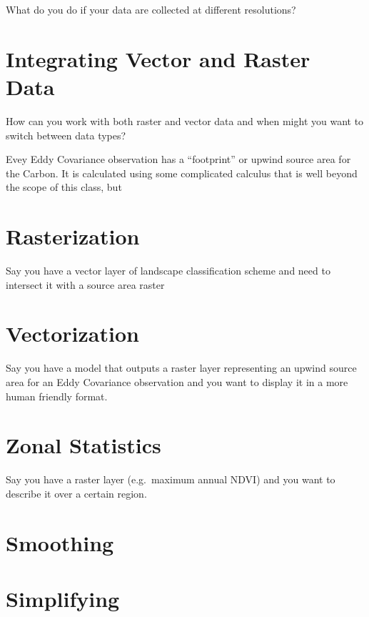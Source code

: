 \documentclass[
]{book}
\begin{document}
What do you do if your data are collected at different resolutions?

\hypertarget{integrating-vector-and-raster-data}{%
\section{Integrating Vector and Raster Data}\label{integrating-vector-and-raster-data}}

How can you work with both raster and vector data and when might you want to switch between data types?

Evey Eddy Covariance observation has a ``footprint'' or upwind source area for the Carbon. It is calculated using some complicated calculus that is well beyond the scope of this class, but

\hypertarget{rasterization}{%
\section{Rasterization}\label{rasterization}}

Say you have a vector layer of landscape classification scheme and need to intersect it with a source area raster

\hypertarget{vectorization}{%
\section{Vectorization}\label{vectorization}}

Say you have a model that outputs a raster layer representing an upwind source area for an Eddy Covariance observation and you want to display it in a more human friendly format.

\hypertarget{zonal-statistics}{%
\section{Zonal Statistics}\label{zonal-statistics}}

Say you have a raster layer (e.g.~maximum annual NDVI) and you want to describe it over a certain region.

\hypertarget{smoothing-1}{%
\section{Smoothing}\label{smoothing-1}}

\hypertarget{simplifying}{%
\section{Simplifying}\label{simplifying}}
\end{document}
